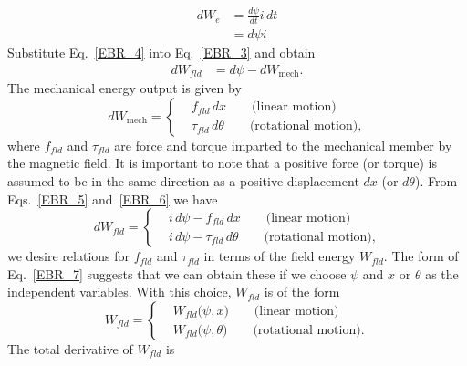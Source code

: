 \documentclass[11pt,a4paper,oneside]{book}
\numberwithin{equation}{section}
\theoremstyle{it}
\theoremstyle{definition}
\begin{document}
\begin{equation}\label{EBR_4}
	\begin{aligned}
		{dW_e}  &= \frac{d\psi}{dt}i\,dt \\[8pt]
			&=d\psi i
	\end{aligned}
\end{equation} 
Substitute Eq.~\eqref{EBR_4} into Eq.~\eqref{EBR_3} and obtain
\begin{equation}\label{EBR_5}
	\begin{aligned}
		dW_{fld}  &= d\psi - dW_{\text{mech}}.
	\end{aligned}
\end{equation} 
The mechanical energy output is given by
\begin{equation}\label{EBR_6}
	dW_{\text{mech}}  = \left\{
	\begin{aligned}
		&f_{fld}\,dx \qquad \text{(linear motion)} \\[8pt]
		&\tau_{fld}\,d\theta \qquad \text{(rotational motion),} 
	\end{aligned}\right.
\end{equation} 
where $f_{fld}$ and $\tau_{fld}$ are force and torque imparted to the mechanical member by the magnetic field. It is important to note that a positive force (or torque) is assumed to be in the same direction as a positive displacement $dx$ (or $d\theta$). From Eqs.~\eqref{EBR_5} and~\ref{EBR_6} we have
\begin{equation}\label{EBR_7}
	dW_{fld}  = \left\{
	\begin{aligned}
		&i\,d\psi - f_{fld}\,dx \qquad \text{(linear motion)} \\[8pt]
		&i\,d\psi - \tau_{fld}\,d\theta \qquad \text{(rotational motion),} 
	\end{aligned}\right.
\end{equation} 
we desire relations for $f_{fld}$ and $\tau_{fld}$ in terms of the field energy $W_{fld}$. The form of Eq.~\eqref{EBR_7} suggests that we can obtain these if we choose $\psi$ and $x$ or $\theta$ as the independent variables. With this choice, $W_{fld}$ is of the form
\begin{equation}\label{EBR_8}
	W_{fld}  = \left\{
	\begin{aligned}
		&W_{fld}\big(\psi,x\big) \qquad \text{(linear motion)} \\[8pt]
		&W_{fld}\big(\psi,\theta\big) \qquad \text{(rotational motion).} 
	\end{aligned}\right.
\end{equation} 
The total derivative of $W_{fld}$ is
\end{document}
